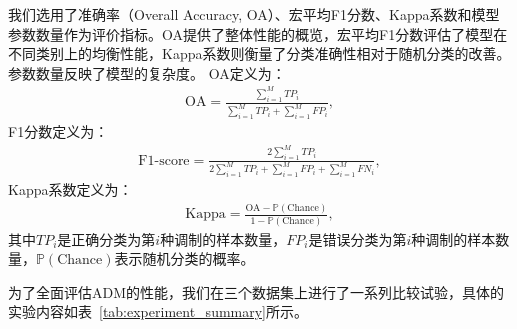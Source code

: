 我们选用了准确率（Overall Accuracy, OA）、宏平均F1分数、Kappa系数和模型参数数量作为评价指标。OA提供了整体性能的概览，宏平均F1分数评估了模型在不同类别上的均衡性能，Kappa系数则衡量了分类准确性相对于随机分类的改善。参数数量反映了模型的复杂度。
OA定义为：
\begin{equation}
        \begin{aligned}
            \text{OA} = \frac{\sum_{i=1}^{M}TP_i}{\sum_{i=1}^{M}TP_i + \sum_{i=1}^{M}FP_i},
        \end{aligned}
    \label{equ: oa}
\end{equation}
F1分数定义为：
\begin{equation}
    \begin{aligned}
        \text{F1-score} = \frac{2\sum_{i=1}^{M}TP_i}{2\sum_{i=1}^{M}TP_i + \sum_{i=1}^{M}FP_i + \sum_{i=1}^{M}FN_i},
    \end{aligned}
    \label{equ: f1}
\end{equation}
Kappa系数定义为：
\begin{equation}
    \begin{aligned}
        \text{Kappa} = \frac{\text{OA} - \mathbb{P}(\text{Chance})}{1 - \mathbb{P}(\text{Chance})},
    \end{aligned}
    \label{equ: kappa}
\end{equation}
其中$TP_i$是正确分类为第$i$种调制的样本数量，$FP_i$是错误分类为第$i$种调制的样本数量，$\mathbb{P}(\text{Chance})$表示随机分类的概率。

为了全面评估ADM的性能，我们在三个数据集上进行了一系列比较试验，具体的实验内容如表~\ref{tab:experiment_summary}所示。

\begin{table}[htpb]
    \centering
    \caption{实验概览}
\end{table}

